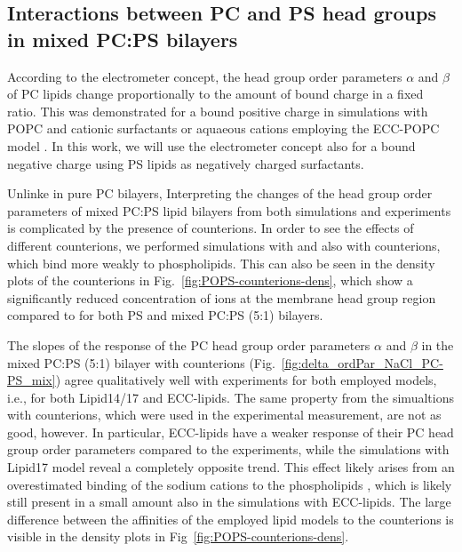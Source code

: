 \documentclass[journal=jpcbfk,manuscript=article]{achemso}
\begin{document}
 
 
 
\subsection{Interactions between PC and PS head groups in mixed PC:PS bilayers}

According to the electrometer concept,
the head group order parameters $\alpha$ and $\beta$ of PC lipids
change proportionally to the amount of bound charge
in a fixed ratio. \cite{seelig87,scherer87,roux90} 
This was demonstrated for a bound positive charge in simulations with POPC and 
cationic surfactants or aquaeous cations employing the ECC-POPC model \cite{melcr18}.
In this work, we will use the electrometer concept also for a bound negative charge 
using PS lipids as negatively charged surfactants. \cite{roux90} 

Unlinke in pure PC bilayers,
Interpreting the changes of the head group order parameters of 
mixed PC:PS lipid bilayers 
from both simulations and experiments
is complicated by the presence of counterions. \cite{nmrlipids_proj4}
In order to see the effects of different counterions, 
we performed simulations with  and also with  counterions, 
which bind more weakly to phospholipids. \cite{nmrlipids_proj4, melcr18}
This can also be seen in the density plots of the counterions in Fig.~\ref{fig:POPS-counterions-dens},
which show a significantly reduced concentration of  ions 
at the membrane head group region compared to 
for both PS and mixed PC:PS (5:1) bilayers. 

The slopes of the response of the PC head group order parameters $\alpha$ and $\beta$ 
in the mixed PC:PS (5:1) bilayer with  counterions
(Fig.~\ref{fig:delta_ordPar_NaCl_PC-PS_mix})
agree qualitatively well with experiments for both employed models,
i.e., for both Lipid14/17 and ECC-lipids. 
The same property from the simualtions with  counterions, 
which were used in the experimental measurement,
are not as good, however.
In particular,
ECC-lipids have a weaker response of their PC head group order parameters compared to the experiments, 
while the simulations with Lipid17 model reveal a completely opposite trend.
This effect likely arises from an overestimated binding of the sodium cations to the phospholipids \cite{nmrlipids_proj4},
which is likely still present in a small amount also in the simulations with ECC-lipids. 
The large difference between the affinities of the employed lipid models to the counterions 
is visible in the density plots in Fig~\ref{fig:POPS-counterions-dens}. 
\end{document}
